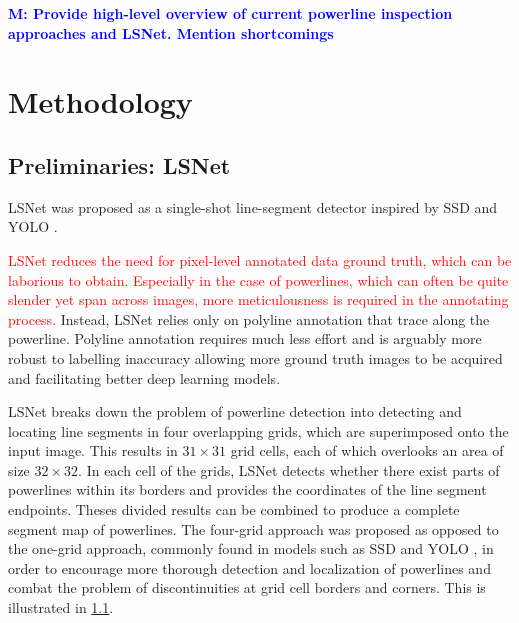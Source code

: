 \documentclass[journal]{IEEEtran}
\newcommand{\commentM}[1]{\textbf{\textcolor{blue}{M: #1}}}
\begin{document}
\commentM{Provide high-level overview of current powerline inspection approaches and LSNet. Mention shortcomings}

\section{Methodology}

\subsection{Preliminaries: LSNet}
LSNet \cite{Nguyen2020} was proposed as a single-shot line-segment detector inspired by SSD \cite{SSD} and YOLO \cite{YOLO}. 

\textcolor{red}{LSNet reduces the need for pixel-level annotated data ground truth, which can be laborious to obtain. Especially in the case of powerlines, which can often be quite slender yet span across images, more meticulousness is required in the annotating process.} Instead, LSNet relies only on polyline annotation that trace along the powerline. Polyline annotation requires much less effort and is arguably more robust to labelling inaccuracy allowing more ground truth images to be acquired and facilitating better deep learning models. 

LSNet breaks down the problem of powerline detection into detecting and locating line segments in four overlapping grids, which are superimposed onto the input image. This results in $31 \times 31$ grid cells, each of which overlooks an area of size $32 \times 32$. In each cell of the grids,  LSNet detects whether there exist parts of powerlines within its borders and provides the coordinates of the line segment endpoints. Theses divided results can be combined to produce a complete segment map of powerlines. The four-grid approach was proposed as opposed to the one-grid approach, commonly found in models such as SSD \cite{SSD} and YOLO \cite{YOLO}, in order to encourage more thorough detection and localization of powerlines and combat the problem of discontinuities at grid cell borders and corners. This is illustrated in \ref{}. 
\end{document}
